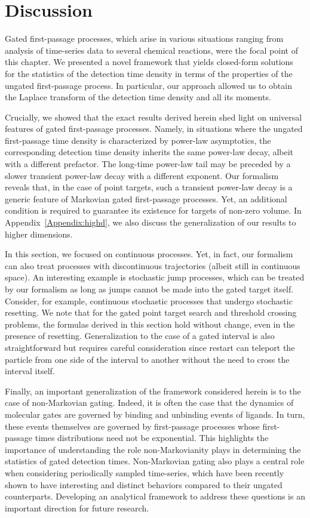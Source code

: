 \section{Discussion} \label{Sec:8}

Gated first-passage processes, which arise in various situations ranging from analysis of time-series data to several chemical reactions, were the focal point of this chapter. We presented a novel framework that yields closed-form solutions for the statistics of the detection time density in terms of the properties of the ungated first-passage process. In particular, our approach allowed us to obtain the Laplace transform of the detection time density and all its moments. 

Crucially, we showed that the exact results derived herein shed light on universal features of gated first-passage processes. Namely, in situations where the ungated first-passage time density is characterized by power-law asymptotics, the corresponding detection time density inherits the same power-law decay, albeit with a different prefactor. The long-time power-law tail may be preceded by a slower transient power-law decay with a different exponent. Our formalism reveals that, in the case of point targets, such a transient power-law decay is a generic feature of Markovian gated first-passage processes. Yet, an additional condition is required to guarantee its existence for targets of non-zero volume. In Appendix~\ref{Appendix:highd}, we also discuss the generalization of our results to higher dimensions. 

In this section, we focused on continuous processes. Yet, in fact, our formalism can also treat processes with discontinuous trajectories (albeit still in continuous space). An interesting example is stochastic jump processes, which can be treated by our formalism as long as jumps cannot be made into the gated target itself. Consider, for example, continuous stochastic processes that undergo stochastic resetting. We note that for the gated point target search and threshold crossing problems, the formulas derived in this section hold without change, even in the presence of resetting. Generalization to the case of a gated interval is also straightforward but requires careful consideration since restart can teleport the particle from one side of the interval to another without the need to cross the interval itself.

Finally, an important generalization of the framework considered herein is to the case of non-Markovian gating. Indeed, it is often the case that the dynamics of molecular gates are governed by binding and unbinding events of ligands. In turn, these events themselves are governed by first-passage processes whose first-passage times distributions need not be exponential. This highlights the importance of understanding the role non-Markovianity plays in determining the statistics of gated detection times. Non-Markovian gating also plays a central role when considering periodically sampled time-series, which have been recently shown to have interesting and distinct behaviors compared to their ungated counterparts. Developing an analytical framework to address these questions is an important direction for future research. 